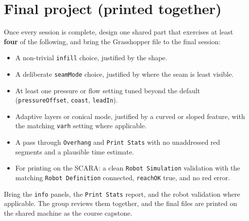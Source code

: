 \documentclass[11pt]{article}
\newcommand{\param}[1]{\texttt{#1}}
\begin{document}
\section{Final project (printed together)}

Once every session is complete, design one shared part that exercises
at least \textbf{four} of the following, and bring the Grasshopper file
to the final session:

\begin{itemize}
  \item A non-trivial \param{infill} choice, justified by the shape.
  \item A deliberate \param{seamMode} choice, justified by where the seam is least visible.
  \item At least one pressure or flow setting tuned beyond the default (\param{pressureOffset}, \param{coast}, \param{leadIn}).
  \item Adaptive layers or conical mode, justified by a curved or sloped feature, with the matching \param{varh} setting where applicable.
  \item A pass through \param{Overhang} and \param{Print Stats} with no unaddressed red segments and a plausible time estimate.
  \item For printing on the SCARA: a clean \param{Robot Simulation} validation with the matching \param{Robot Definition} connected, \param{reachOK} true, and no red error.
\end{itemize}

Bring the \param{info} panels, the \param{Print Stats} report,
and the robot validation where applicable. The group reviews them
together, and the final files are printed on the shared machine as the
course capstone.
\end{document}
